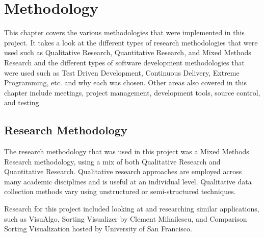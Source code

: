 \chapter{Methodology}
This chapter covers the various methodologies that were implemented in this 
project. It takes a look at the different types of research methodologies that 
were used such as Qualitative Research, Quantitative Research, and Mixed Methods
Research and the different types of software development methodologies that were
used such as Test Driven Development, Continuous Delivery, Extreme Programming, 
etc. and why each was chosen. Other areas also covered in this chapter include
meetings, project management, development tools, source control, and testing.

\section{Research Methodology}
The research methodology that was used in this project was a Mixed Methods 
Research methodology, using a mix of both Qualitative Research and Quantitative 
Research. Qualitative research approaches are employed across many academic 
disciplines and is useful at an individual level. Qualitative data collection
methods vary using unstructured or semi-structured techniques.
\par
\medskip
Research for this project included looking at and researching similar applications, such as VisuAlgo, Sorting Visualizer by Clement Mihailescu, and Comparison Sorting Visualization hosted by University of San Francisco. 

\newpage
